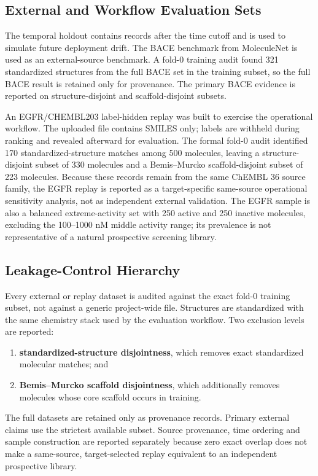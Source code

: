 \documentclass[manuscript=article]{achemso}
\begin{document}
\subsection{External and Workflow Evaluation Sets}
The temporal holdout contains records after the time cutoff and is used to
simulate future deployment drift. The BACE benchmark from MoleculeNet
\cite{moleculenet} is used as an external-source benchmark. A fold-0 training
audit found 321 standardized structures from the full BACE set in the training
subset, so the full BACE result is retained only for provenance. The primary
BACE evidence is reported on structure-disjoint and scaffold-disjoint subsets.

An EGFR/CHEMBL203 label-hidden replay was built to exercise the operational
workflow. The uploaded file contains SMILES only; labels are withheld during
ranking and revealed afterward for evaluation. The formal fold-0 audit
identified 170 standardized-structure matches among 500 molecules, leaving a
structure-disjoint subset of 330 molecules and a Bemis--Murcko
scaffold-disjoint subset of 223 molecules. Because these records remain from
the same ChEMBL 36 source family, the EGFR replay is reported as a
target-specific same-source operational sensitivity analysis, not as independent
external validation. The EGFR sample is also a balanced extreme-activity set
with 250 active and 250 inactive molecules, excluding the 100--1000 nM middle
activity range; its prevalence is not representative of a natural prospective
screening library.

\subsection{Leakage-Control Hierarchy}
Every external or replay dataset is audited against the exact fold-0 training
subset, not against a generic project-wide file. Structures are standardized
with the same chemistry stack used by the evaluation workflow. Two exclusion
levels are reported:
\begin{enumerate}
  \item \textbf{standardized-structure disjointness}, which removes exact
        standardized molecular matches; and
  \item \textbf{Bemis--Murcko scaffold disjointness}, which additionally
        removes molecules whose core scaffold occurs in training.
\end{enumerate}
The full datasets are retained only as provenance records. Primary external
claims use the strictest available subset. Source provenance, time ordering
and sample construction are reported separately because zero exact overlap
does not make a same-source, target-selected replay equivalent to an
independent prospective library.
\end{document}
